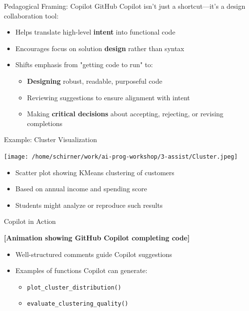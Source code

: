 \documentclass[xcolor=dvipsnames, aspectratio=169]{beamer}
\begin{document}
\begin{frame}{Pedagogical Framing: Copilot}
  GitHub Copilot isn't just a shortcut—it's a design collaboration tool:
  \begin{itemize}
    \item Helps translate high-level \textbf{intent} into functional code
    \item Encourages focus on solution \textbf{design} rather than syntax
    \item Shifts emphasis from "getting code to run" to:
      \begin{itemize}
        \item \textbf{Designing} robust, readable, purposeful code
        \item Reviewing suggestions to ensure alignment with intent
        \item Making \textbf{critical decisions} about accepting, rejecting, or revising completions
      \end{itemize}
  \end{itemize}
\end{frame}

\begin{frame}{Example: Cluster Visualization}
  \begin{center}
    \texttt{[image: /home/schirner/work/ai-prog-workshop/3-assist/Cluster.jpeg]}
  \end{center}
  \begin{itemize}
    \item Scatter plot showing KMeans clustering of customers
    \item Based on annual income and spending score
    \item Students might analyze or reproduce such results
  \end{itemize}
\end{frame}

\begin{frame}{Copilot in Action}
  \begin{center}
    \textbf{[Animation showing GitHub Copilot completing code]}
  \end{center}
  \begin{itemize}
    \item Well-structured comments guide Copilot suggestions
    \item Examples of functions Copilot can generate:
      \begin{itemize}
        \item \texttt{plot\_cluster\_distribution()}
        \item \texttt{evaluate\_clustering\_quality()}
      \end{itemize}
  \end{itemize}
\end{frame}
\end{document}
